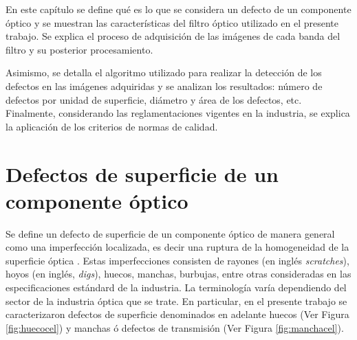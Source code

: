 

\singlespacing
{}

\hspace{0.5cm}En este capítulo se define qué es lo que se considera un defecto de un componente óptico y se muestran las características del filtro óptico utilizado en el presente trabajo. Se explica el proceso de adquisición de las imágenes de cada banda del filtro y su posterior procesamiento. 

Asimismo, se detalla el algoritmo utilizado para realizar la detección de los defectos en las imágenes adquiridas y se analizan los resultados: número de defectos por unidad de superficie, diámetro y área de los defectos, etc. Finalmente, considerando las reglamentaciones vigentes en la industria, se explica la aplicación de los criterios de normas de calidad.

\singlespacing
\section{Defectos de superficie de un componente óptico}
\label{sec:defectsurf}



\hspace{0.5cm}Se define un defecto de superficie de un componente óptico de manera general como una imperfección localizada, es decir una ruptura de la homogeneidad de la superficie óptica \cite{Gomez_1998}. Estas imperfecciones consisten de rayones (en inglés \textit{scratches}), hoyos (en inglés, \textit{digs}), huecos, manchas, burbujas, entre otras consideradas en las especificaciones estándard de la industria. La terminología varía dependiendo del sector de la industria óptica que se trate. En particular, en el presente trabajo se caracterizaron defectos de superficie denominados en adelante huecos (Ver Figura \ref{fig:huecocel}) y manchas ó defectos de transmisión (Ver Figura \ref{fig:manchacel}). 

